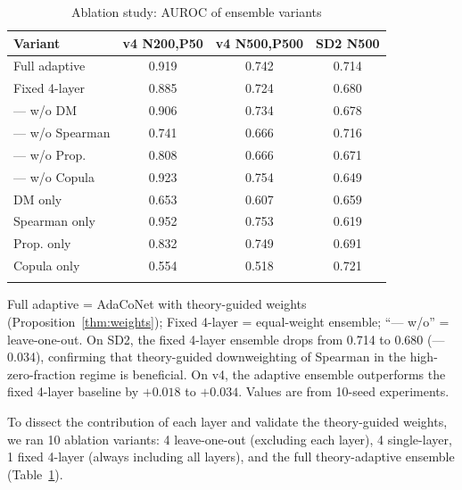 \documentclass[unnumsec,webpdf,contemporary,large,numbered]{oup-authoring-template}
\theoremstyle{plain}
\theoremstyle{definition}
\begin{document}
\begin{table}[!t]
\caption{Ablation study: AUROC of ensemble variants}\label{tab:ablation}
\centering
\small
\setlength{\tabcolsep}{5pt}
\begin{tabular}{lccc}
\toprule
\textbf{Variant} & \textbf{v4 N200,P50} & \textbf{v4 N500,P500} & \textbf{SD2 N500} \\
\midrule
Full adaptive       & 0.919                & 0.742                & 0.714             \\
Fixed 4-layer       & 0.885                & 0.724                & 0.680             \\
\midrule
--- w/o DM           & 0.906                & 0.734                & 0.678             \\
--- w/o Spearman     & 0.741                & 0.666                & 0.716             \\
--- w/o Prop.        & 0.808                & 0.666                & 0.671             \\
--- w/o Copula       & 0.923                & 0.754                & 0.649             \\
\midrule
DM only              & 0.653                & 0.607                & 0.659             \\
Spearman only        & 0.952                & 0.753                & 0.619             \\
Prop. only           & 0.832                & 0.749                & 0.691             \\
Copula only          & 0.554                & 0.518                & 0.721             \\
\botrule
\end{tabular}
\begin{tablenotes}
\small
Full adaptive = AdaCoNet with theory-guided weights (Proposition~\ref{thm:weights}); Fixed 4-layer = equal-weight ensemble; ``--- w/o'' = leave-one-out. On SD2, the fixed 4-layer ensemble drops from 0.714 to 0.680 (---0.034), confirming that theory-guided downweighting of Spearman in the high-zero-fraction regime is beneficial. On v4, the adaptive ensemble outperforms the fixed 4-layer baseline by $+0.018$ to $+0.034$. Values are from 10-seed experiments.
\end{tablenotes}
\end{table}

To dissect the contribution of each layer and validate the theory-guided weights, we ran 10 ablation variants: 4 leave-one-out (excluding each layer), 4 single-layer, 1 fixed 4-layer (always including all layers), and the full theory-adaptive ensemble (Table~\ref{tab:ablation}).
\end{document}
